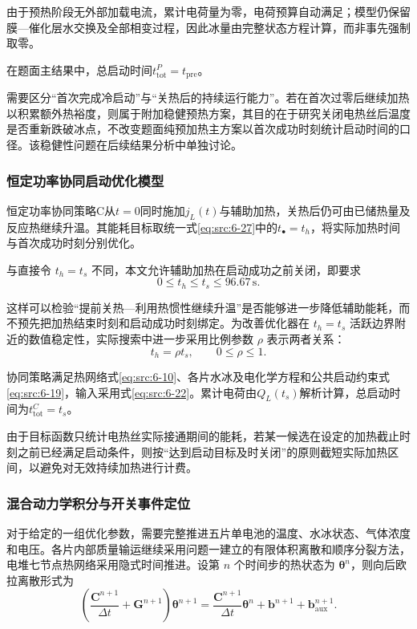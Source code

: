 \documentclass[bwprint]{gmcmthesis}
\numberwithin{equation}{section}
\numberwithin{figure}{section}
\begin{document}
 由于预热阶段无外部加载电流，累计电荷量为零，电荷预算自动满足；模型仍保留膜—催化层水交换及全部相变过程，因此冰量由完整状态方程计算，而非事先强制取零。

 在题面主结果中，总启动时间$t_{\mathrm{tot}}^P=t_{\mathrm{pre}}$。

 需要区分“首次完成冷启动”与“关热后的持续运行能力”。若在首次过零后继续加热以积累额外热裕度，则属于附加稳健预热方案，其目的在于研究关闭电热丝后温度是否重新跌破冰点，不改变题面纯预加热主方案以首次成功时刻统计启动时间的口径。该稳健性问题在后续结果分析中单独讨论。

\subsubsection{恒定功率协同启动优化模型}

 恒定功率协同策略C从$t=0$同时施加$j_L(t)$与辅助加热，关热后仍可由已储热量及反应热继续升温。其能耗目标取统一式\eqref{eq:src:6-27}中的$t_\bullet=t_h$，将实际加热时间与首次成功时刻分别优化。

 与直接令 \(t_h = t_s\) 不同，本文允许辅助加热在启动成功之前关闭，即要求
\begin{equation}
0 \leq t_h \leq t_s \leq 96.67 \, \text{s}. \label{eq:src:6-34}
\end{equation}

 这样可以检验“提前关热—利用热惯性继续升温”是否能够进一步降低辅助能耗，而不预先把加热结束时刻和启动成功时刻绑定。为改善优化器在 \(t_h = t_s\) 活跃边界附近的数值稳定性，实际搜索中进一步采用比例参数 \(\rho\) 表示两者关系：
\begin{equation}
t_h = \rho t_s, \qquad 0 \leq \rho \leq 1. \label{eq:src:6-35}
\end{equation}

 协同策略满足热网络式\eqref{eq:src:6-10}、各片水冰及电化学方程和公共启动约束式\eqref{eq:src:6-19}，输入采用式\eqref{eq:src:6-22}。累计电荷由$Q_L(t_s)$解析计算，总启动时间为$t_{\mathrm{tot}}^C=t_s$。

 由于目标函数只统计电热丝实际接通期间的能耗，若某一候选在设定的加热截止时刻之前已经满足启动条件，则按“达到启动目标及时关闭”的原则截短实际加热区间，以避免对无效持续加热进行计费。

\subsubsection{混合动力学积分与开关事件定位}

 对于给定的一组优化参数，需要完整推进五片单电池的温度、水冰状态、气体浓度和电压。各片内部质量输运继续采用问题一建立的有限体积离散和顺序分裂方法，电堆七节点热网络采用隐式时间推进。设第 \(n\) 个时间步的热状态为 \(\boldsymbol{\theta}^n\)，则向后欧拉离散形式为
\begin{equation}
\left( \frac{\mathbf{C}^{n+1}}{\Delta t} + \mathbf{G}^{n+1} \right) \boldsymbol{\theta}^{n+1} = \frac{\mathbf{C}^{n+1}}{\Delta t} \boldsymbol{\theta}^n + \mathbf{b}^{n+1} + \mathbf{b}_{\text{aux}}^{n+1}. \label{eq:src:6-38}
\end{equation}
\end{document}
